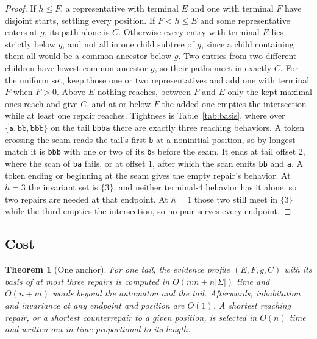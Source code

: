 \documentclass[11pt,a4paper]{article}
\theoremstyle{definition}
\theoremstyle{plain}
\newtheorem{theorem}{Theorem}
\theoremstyle{remark}
\newcommand{\code}[1]{\texttt{#1}}
\begin{document}
\begin{proof}
If $h \le F$, a representative with terminal $E$ and one with terminal $F$ have disjoint starts, settling every
position. If $F < h \le E$ and some representative enters at $g$, its path alone is $C$. Otherwise every entry with
terminal $E$ lies strictly below $g$, and not all in one child subtree of $g$, since a child containing them all would
be a common ancestor below $g$. Two entries from two different children have lowest common ancestor $g$, so their paths
meet in exactly $C$. For the uniform set, keep those one or two representatives and add one with terminal $F$ when
$F > 0$. Above $E$ nothing reaches, between $F$ and $E$ only the kept maximal ones reach and give $C$, and at or below
$F$ the added one empties the intersection while at least one repair reaches. Tightness is Table~\ref{tab:basis}, where
over $\{\code{a}, \code{bb}, \code{bbb}\}$ on the tail \code{bbba} there are exactly three reaching behaviors. A token
crossing the seam reads the tail's first \code{b} at a noninitial position, so by longest match it is \code{bbb} with
one or two of its \code{b}s before the seam. It ends at tail offset $2$, where the scan of \code{ba} fails, or at offset
$1$, after which the scan emits \code{bb} and \code{a}. A token ending or beginning at the seam gives the empty repair's
behavior. At $h = 3$ the invariant set is $\{3\}$, and neither terminal-$4$ behavior has it alone, so two repairs are
needed at that endpoint. At $h = 1$ those two still meet in $\{3\}$ while the third empties the intersection, so no pair
serves every endpoint.
\end{proof}

\subsection{Cost}

\begin{theorem}[One anchor]
\label{thm:cost}
For one tail, the evidence profile $(E, F, g, C)$ with its basis of at most three repairs is computed in
$O(nm + n|\Sigma|)$ time and $O(n + m)$ words beyond the automaton and the tail. Afterwards, inhabitation and invariance
at any endpoint and position are $O(1)$. A shortest reaching repair, or a shortest counterrepair to a given position, is
selected in $O(n)$ time and written out in time proportional to its length.
\end{theorem}
\end{document}
